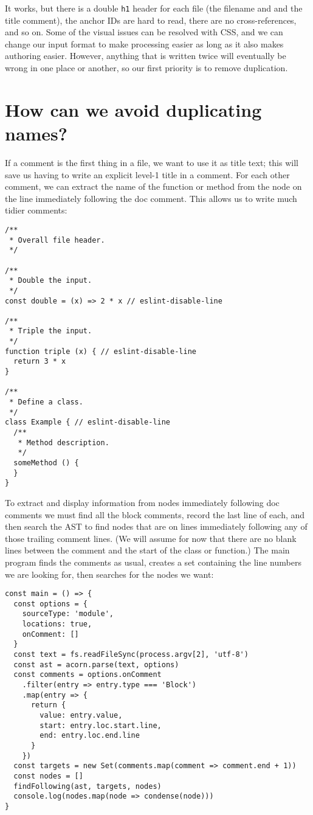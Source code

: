 \documentclass[krantzl]{krantz}
\begin{document}
It works,
but there is a double \texttt{h1} header for each file (the filename and and the title comment),
the anchor IDs are hard to read,
there are no cross-references,
and so on.
Some of the visual issues can be resolved with CSS,
and we can change our input format to make processing easier
as long as it also makes authoring easier.
However,
anything that is written twice will eventually be wrong in one place or another,
so our first priority is to remove duplication.

\section{How can we avoid duplicating names?}\label{doc-generator-dup}


If a comment is the first thing in a file,
we want to use it as title text;
this will save us having to write an explicit level-1 title in a comment.
For each other comment,
we can extract the name of the function or method
from the node on the line immediately following the doc comment.
This allows us to write much tidier comments:


\begin{lstlisting}[frame=single,frameround=tttt]
/**
 * Overall file header.
 */

/**
 * Double the input.
 */
const double = (x) => 2 * x // eslint-disable-line

/**
 * Triple the input.
 */
function triple (x) { // eslint-disable-line
  return 3 * x
}

/**
 * Define a class.
 */
class Example { // eslint-disable-line
  /**
   * Method description.
   */
  someMethod () {
  }
}
\end{lstlisting}



To extract and display information from nodes immediately following doc comments
we must find all the block comments,
record the last line of each,
and then search the AST to find nodes that are on lines
immediately following any of those trailing comment lines.
(We will assume for now that there are no blank lines between the comment
and the start of the class or function.)
The main program finds the comments as usual,
creates a set containing the line numbers we are looking for,
then searches for the nodes we want:


\begin{lstlisting}[frame=single,frameround=tttt]
const main = () => {
  const options = {
    sourceType: 'module',
    locations: true,
    onComment: []
  }
  const text = fs.readFileSync(process.argv[2], 'utf-8')
  const ast = acorn.parse(text, options)
  const comments = options.onComment
    .filter(entry => entry.type === 'Block')
    .map(entry => {
      return {
        value: entry.value,
        start: entry.loc.start.line,
        end: entry.loc.end.line
      }
    })
  const targets = new Set(comments.map(comment => comment.end + 1))
  const nodes = []
  findFollowing(ast, targets, nodes)
  console.log(nodes.map(node => condense(node)))
}
\end{lstlisting}
\end{document}
